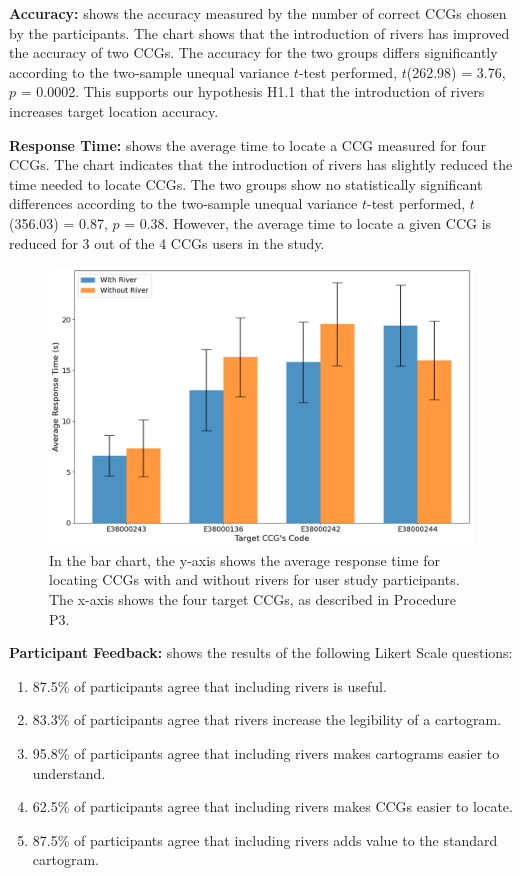 \documentclass[Afour,sagev,times]{sagej}
\newcommand{\bobgraph}[1]{\noindent\textbf{#1}}
\begin{document}
\bobgraph{Accuracy:}  shows the accuracy measured by the number of correct CCGs chosen by the participants.
The chart shows that the introduction of rivers has improved the accuracy of two CCGs.
The accuracy for the two groups differs significantly according to the two-sample unequal variance $t$-test performed, $t$(262.98) = 3.76, $p$ = 0.0002.
This supports our hypothesis H1.1 that the introduction of rivers increases target location accuracy.


\bobgraph{Response Time:}  shows the average time to locate a CCG measured for four CCGs.
The chart indicates that the introduction of rivers has slightly reduced the time needed to locate CCGs.
The two groups show no statistically significant differences according to the two-sample unequal variance $t$-test performed, $t$(356.03) = 0.87, $p$ = 0.38.
However, the average time to locate a given CCG is reduced for 3 out of the 4 CCGs users in the study.

    {
        \begin{figure}[t!]
            \centering
            \includegraphics[width=\columnwidth,keepaspectratio]{rt.png}
            \caption{In the bar chart, the y-axis shows the average response time for locating CCGs with and without rivers for user study participants.
                The x-axis shows the four target CCGs, as described in Procedure P3.}
            \label{fig:task-rt}
        \end{figure}
    }

\bobgraph{Participant Feedback:}  shows the results of the following Likert Scale questions:
\begin{enumerate}[label=(\Alph*),align=left,leftmargin=*,labelindent=1em]
    \item 87.5\% of participants agree that including rivers is useful.
    \item 83.3\% of participants agree that rivers increase the legibility of a cartogram.
    \item 95.8\% of participants agree that including rivers makes cartograms easier to understand.
    \item 62.5\% of participants agree that including rivers makes CCGs easier to locate.
    \item 87.5\% of participants agree that including rivers adds value to the standard cartogram.
\end{enumerate}
\end{document}
